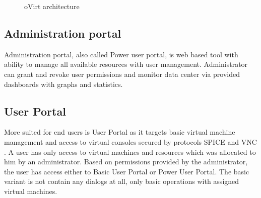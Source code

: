 \begin{figure}[h]
\caption{oVirt architecture \cite{oVirtImg}}
\label{ovirt_architecture}
\end{figure}

\subsection{Administration portal}
Administration portal, also called Power user portal, is web based tool with ability to manage all available resources with user management. Administrator can grant and revoke user permissions and monitor data center via provided dashboards with graphs and statistics. 

\subsection{User Portal}\label{userportal}
More suited for end users is User Portal as it targets basic virtual machine management and access to virtual consoles secured by protocols SPICE \cite{SPICE} and VNC \cite{VNC}. A user has only access to virtual machines and resources which was allocated to him by an administrator. Based on permissions provided by the administrator, the user has access either to Basic User Portal or Power User Portal. The basic variant is not contain any dialogs at all, only basic operations with assigned virtual machines.

